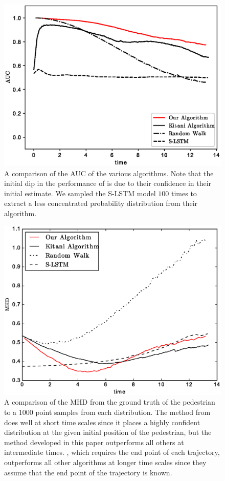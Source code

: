 \documentclass[letterpaper,10pt,conference]{ieeetran}
\begin{document}
\begin{figure}
	\centering
	\includegraphics[width=0.9\linewidth]{./figures/the_results.eps}
	\caption{A comparison of the AUC of the various algorithms. Note that the initial dip in the performance of \cite{Kitani2012} is due to their confidence in their initial estimate. We sampled the S-LSTM \cite{Alahi2016} model $100$ times to extract a less concentrated probability distribution from their algorithm.}
	\label{fig:auc_vs_time}
	\vspace*{-0.75cm}
\end{figure}

\begin{figure}
	\centering
	\includegraphics[width=0.9\linewidth]{./figures/MHD_results.eps}
	\caption{A comparison of the MHD from the ground truth of the pedestrian to a 1000 point samples from each distribution. The method from \cite{Alahi2016} does well at short time scales since it places a highly confident distribution at the given initial position of the pedestrian, but the method developed in this paper outperforms all others at intermediate times. \cite{Kitani2012}, which requires the end point of each trajectory, outperforms all other algorithms at longer time scales since they assume that the end point of the trajectory is known.}
	\label{fig:mhd_vs_time}
	\vspace*{-0.7cm}
\end{figure}
\end{document}
